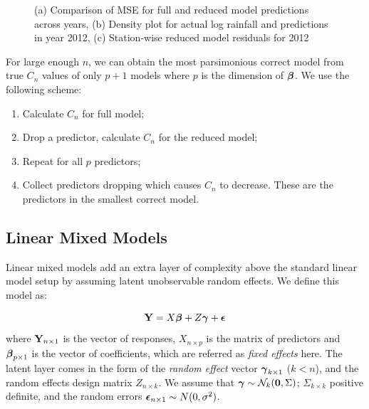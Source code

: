 \documentclass[11pt,twocolumn,twoside]{IEEEtran}
\begin{document}
\begin{figure}
\captionsetup{justification=centering, font=footnotesize}
\begin{center}
\caption{(a) Comparison of MSE for full and reduced model predictions across years, (b) Density plot for actual log rainfall and predictions in year 2012, (c) Station-wise reduced model residuals for 2012}
\label{fig:prepost}
\end{center}
\end{figure}

For large enough $n$, we can obtain the most parsimonious correct model from true $C_n$ values of only $p+1$ models where $p$ is the dimension of ${\boldsymbol{\beta}}$.  We use the following scheme:
\begin{enumerate}
\item Calculate $C_n$ for full model;
\item Drop a predictor, calculate $C_n$ for the reduced model;
\item Repeat for all $p$ predictors;
\item Collect predictors dropping which causes $C_n$ to decrease. These are the predictors in the smallest correct model.
\end{enumerate}

\subsection{Linear Mixed Models}
Linear mixed models add an extra layer of complexity above the standard linear model setup by assuming latent unobservable random effects. We define this model as:

\begin{equation}\label{eqn:mixedmodel}
{\mathbf{Y}} = X {\boldsymbol{\beta}} + Z {\boldsymbol{\gamma}} + {\boldsymbol{\epsilon}}
\end{equation}
where ${\mathbf{Y}}_{n\times 1}$ is the vector of responses, $X_{n \times p}$ is the matrix of predictors and ${\boldsymbol{\beta}}_{p\times 1}$ is the vector of coefficients, which are referred as \textit{fixed effects} here. The latent layer comes in the form of the \textit{random effect} vector ${\boldsymbol{\gamma}}_{k\times 1}$ ($k < n$), and the random effects design matrix $Z_{n \times k}$. We assume that ${\boldsymbol{\gamma}} \sim \mathcal{N}_k ({\bf 0}, \Sigma)$; $\Sigma_{k \times k}$ positive definite, and the random errors ${\boldsymbol{\epsilon}}_{n \times 1} \sim N(0,\sigma^2)$.
\end{document}

